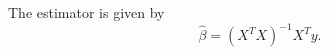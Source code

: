 \documentclass[article]{jss}
\begin{document}
The estimator is given by
\begin{equation}
\hat{\beta} = (X^T X)^{-1} X^T y.
\end{equation}
\end{document}
